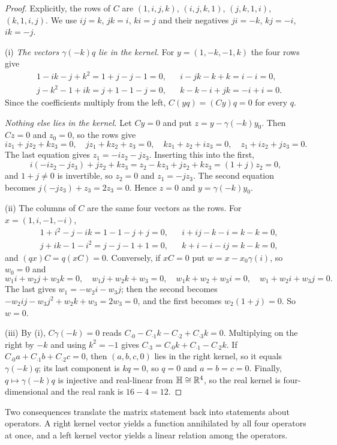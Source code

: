 \begin{proof}
Explicitly, the rows of $C$ are $(1,i,j,k)$, $(i,j,k,1)$, $(j,k,1,i)$, $(k,1,i,j)$. We use $ij=k$, $jk=i$, $ki=j$ and their negatives $ji=-k$, $kj=-i$, $ik=-j$.

(i) \emph{The vectors $\gamma(-k)q$ lie in the kernel.} For $y=(1,-k,-1,k)$ the four rows give
\begin{align*}
&1-ik-j+k^2=1+j-j-1=0, && i-jk-k+k=i-i=0,\\
&j-k^2-1+ik=j+1-1-j=0, && k-k-i+jk=-i+i=0 .
\end{align*}
Since the coefficients multiply from the left, $C(yq)=(Cy)q=0$ for every $q$.

\emph{Nothing else lies in the kernel.} Let $Cy=0$ and put $z=y-\gamma(-k)y_0$. Then $Cz=0$ and $z_0=0$, so the rows give
\[
iz_1+jz_2+kz_3=0,\quad jz_1+kz_2+z_3=0,\quad kz_1+z_2+iz_3=0,\quad z_1+iz_2+jz_3=0 .
\]
The last equation gives $z_1=-iz_2-jz_3$. Inserting this into the first,
\[
i(-iz_2-jz_3)+jz_2+kz_3=z_2-kz_3+jz_2+kz_3=(1+j)z_2=0,
\]
and $1+j\ne0$ is invertible, so $z_2=0$ and $z_1=-jz_3$. The second equation becomes $j(-jz_3)+z_3=2z_3=0$. Hence $z=0$ and $y=\gamma(-k)y_0$.

(ii) The columns of $C$ are the same four vectors as the rows. For $x=(1,i,-1,-i)$,
\begin{align*}
&1+i^2-j-ik=1-1-j+j=0, && i+ij-k-i=k-k=0,\\
&j+ik-1-i^2=j-j-1+1=0, && k+i-i-ij=k-k=0,
\end{align*}
and $(qx)C=q(xC)=0$. Conversely, if $xC=0$ put $w=x-x_0\gamma(i)$, so $w_0=0$ and
\[
w_1i+w_2j+w_3k=0,\quad w_1j+w_2k+w_3=0,\quad w_1k+w_2+w_3i=0,\quad w_1+w_2i+w_3j=0 .
\]
The last gives $w_1=-w_2i-w_3j$; then the second becomes $-w_2ij-w_3j^2+w_2k+w_3=2w_3=0$, and the first becomes $w_2(1+j)=0$. So $w=0$.

(iii) By (i), $C\gamma(-k)=0$ reads $C_{\cdot0}-C_{\cdot1}k-C_{\cdot2}+C_{\cdot3}k=0$. Multiplying on the right by $-k$ and using $k^2=-1$ gives $C_{\cdot3}=C_{\cdot0}k+C_{\cdot1}-C_{\cdot2}k$. If $C_{\cdot0}a+C_{\cdot1}b+C_{\cdot2}c=0$, then $(a,b,c,0)$ lies in the right kernel, so it equals $\gamma(-k)q$; its last component is $kq=0$, so $q=0$ and $a=b=c=0$. Finally, $q\mapsto\gamma(-k)q$ is injective and real-linear from $\mathbb{H}\cong\mathbb{R}^4$, so the real kernel is four-dimensional and the real rank is $16-4=12$.
\end{proof}

Two consequences translate the matrix statement back into statements about operators. A right kernel vector yields a function annihilated by all four operators at once, and a left kernel vector yields a linear relation among the operators.

